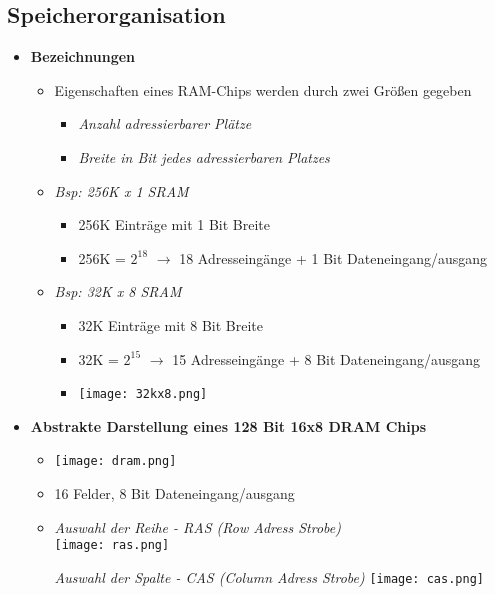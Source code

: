 \subsection{Speicherorganisation}
    \begin{itemize}
        \item \textbf{Bezeichnungen}
            \begin{itemize}
                \item Eigenschaften eines RAM-Chips werden durch zwei Grö\ss en gegeben
                    \begin{itemize}
                        \item \textit{Anzahl adressierbarer Plätze}
                        \item \textit{Breite in Bit jedes adressierbaren Platzes}
                    \end{itemize}
                \item \textit{Bsp: 256K x 1 SRAM}
                    \begin{itemize}
                        \item 256K Einträge mit 1 Bit Breite
                        \item 256K = $2^18$ $\rightarrow$ 18 Adresseingänge + 1 Bit Dateneingang/ausgang
                    \end{itemize}
                \item \textit{Bsp: 32K x 8 SRAM}
                    \begin{itemize}
                        \item 32K Einträge mit 8 Bit Breite
                        \item 32K = $2^15$ $\rightarrow$ 15 Adresseingänge + 8 Bit Dateneingang/ausgang
                        \item[] \texttt{[image: 32kx8.png]}
                    \end{itemize}
            \end{itemize}

\pagebreak

        \item \textbf{Abstrakte Darstellung eines 128 Bit 16x8 DRAM Chips}
            \begin{itemize}
                \item[] \texttt{[image: dram.png]}
                \item[] 16 Felder, 8 Bit Dateneingang/ausgang 
                \item[]
                    \begin{minipage}{0.45\textwidth}
                        \textit{Auswahl der Reihe - RAS (Row Adress Strobe)} \\
                        \texttt{[image: ras.png]}
                    \end{minipage}
                    \begin{minipage}{0.45\textwidth}
                        \textit{Auswahl der Spalte - CAS (Column Adress Strobe)}
                        \texttt{[image: cas.png]}
                    \end{minipage}
            \end{itemize}


\end{itemize}
